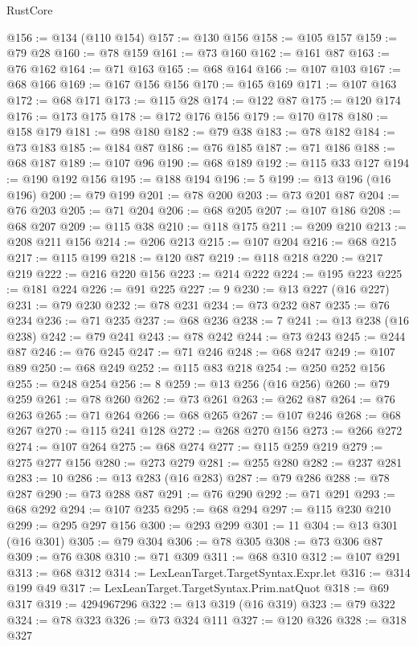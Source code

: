 \begin{lexlean}{RustCore}
\begin{coremodule}
@156 := @134 (@110 @154)
@157 := @130 @156
@158 := @105 @157
@159 := @79 @28
@160 := @78 @159
@161 := @73 @160
@162 := @161 @87
@163 := @76 @162
@164 := @71 @163
@165 := @68 @164
@166 := @107 @103
@167 := @68 @166
@169 := @167 @156 @156
@170 := @165 @169
@171 := @107 @163
@172 := @68 @171
@173 := @115 @28
@174 := @122 @87
@175 := @120 @174
@176 := @173 @175
@178 := @172 @176 @156
@179 := @170 @178
@180 := @158 @179
@181 := @98 @180
@182 := @79 @38
@183 := @78 @182
@184 := @73 @183
@185 := @184 @87
@186 := @76 @185
@187 := @71 @186
@188 := @68 @187
@189 := @107 @96
@190 := @68 @189
@192 := @115 @33 @127
@194 := @190 @192 @156
@195 := @188 @194
@196 := 5
@199 := @13 @196 (@16 @196)
@200 := @79 @199
@201 := @78 @200
@203 := @73 @201 @87
@204 := @76 @203
@205 := @71 @204
@206 := @68 @205
@207 := @107 @186
@208 := @68 @207
@209 := @115 @38
@210 := @118 @175
@211 := @209 @210
@213 := @208 @211 @156
@214 := @206 @213
@215 := @107 @204
@216 := @68 @215
@217 := @115 @199
@218 := @120 @87
@219 := @118 @218
@220 := @217 @219
@222 := @216 @220 @156
@223 := @214 @222
@224 := @195 @223
@225 := @181 @224
@226 := @91 @225
@227 := 9
@230 := @13 @227 (@16 @227)
@231 := @79 @230
@232 := @78 @231
@234 := @73 @232 @87
@235 := @76 @234
@236 := @71 @235
@237 := @68 @236
@238 := 7
@241 := @13 @238 (@16 @238)
@242 := @79 @241
@243 := @78 @242
@244 := @73 @243
@245 := @244 @87
@246 := @76 @245
@247 := @71 @246
@248 := @68 @247
@249 := @107 @89
@250 := @68 @249
@252 := @115 @83 @218
@254 := @250 @252 @156
@255 := @248 @254
@256 := 8
@259 := @13 @256 (@16 @256)
@260 := @79 @259
@261 := @78 @260
@262 := @73 @261
@263 := @262 @87
@264 := @76 @263
@265 := @71 @264
@266 := @68 @265
@267 := @107 @246
@268 := @68 @267
@270 := @115 @241 @128
@272 := @268 @270 @156
@273 := @266 @272
@274 := @107 @264
@275 := @68 @274
@277 := @115 @259 @219
@279 := @275 @277 @156
@280 := @273 @279
@281 := @255 @280
@282 := @237 @281
@283 := 10
@286 := @13 @283 (@16 @283)
@287 := @79 @286
@288 := @78 @287
@290 := @73 @288 @87
@291 := @76 @290
@292 := @71 @291
@293 := @68 @292
@294 := @107 @235
@295 := @68 @294
@297 := @115 @230 @210
@299 := @295 @297 @156
@300 := @293 @299
@301 := 11
@304 := @13 @301 (@16 @301)
@305 := @79 @304
@306 := @78 @305
@308 := @73 @306 @87
@309 := @76 @308
@310 := @71 @309
@311 := @68 @310
@312 := @107 @291
@313 := @68 @312
@314 := LexLeanTarget.TargetSyntax.Expr.let
@316 := @314 @199 @49
@317 := LexLeanTarget.TargetSyntax.Prim.natQuot
@318 := @69 @317
@319 := 4294967296
@322 := @13 @319 (@16 @319)
@323 := @79 @322
@324 := @78 @323
@326 := @73 @324 @111
@327 := @120 @326
@328 := @318 @327

\end{coremodule}
\end{lexlean}
